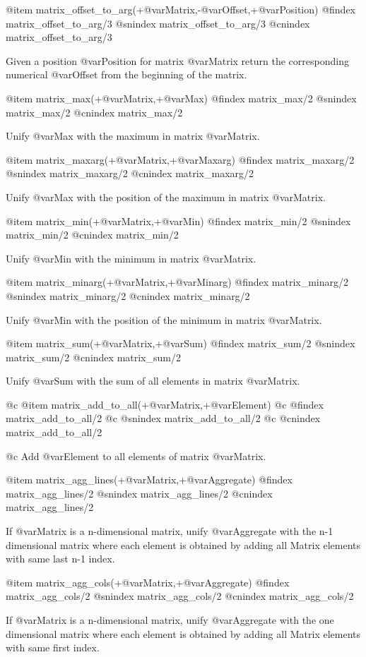 {{{{{{{{{@item matrix_offset_to_arg(+@var{Matrix},-@var{Offset},+@var{Position})
@findex matrix_offset_to_arg/3
@snindex matrix_offset_to_arg/3
@cnindex matrix_offset_to_arg/3

Given a position @var{Position } for matrix @var{Matrix} return the
corresponding numerical @var{Offset} from the beginning of the matrix.

@item matrix_max(+@var{Matrix},+@var{Max})
@findex matrix_max/2
@snindex matrix_max/2
@cnindex matrix_max/2

Unify @var{Max} with the maximum in matrix  @var{Matrix}.

@item matrix_maxarg(+@var{Matrix},+@var{Maxarg})
@findex matrix_maxarg/2
@snindex matrix_maxarg/2
@cnindex matrix_maxarg/2

Unify @var{Max} with the position of the maximum in matrix  @var{Matrix}.

@item matrix_min(+@var{Matrix},+@var{Min})
@findex matrix_min/2
@snindex matrix_min/2
@cnindex matrix_min/2

Unify @var{Min} with the minimum in matrix  @var{Matrix}.

@item matrix_minarg(+@var{Matrix},+@var{Minarg})
@findex matrix_minarg/2
@snindex matrix_minarg/2
@cnindex matrix_minarg/2

Unify @var{Min} with the position of the minimum in matrix  @var{Matrix}.

@item matrix_sum(+@var{Matrix},+@var{Sum})
@findex matrix_sum/2
@snindex matrix_sum/2
@cnindex matrix_sum/2

Unify @var{Sum} with the sum of all elements in matrix  @var{Matrix}.

@c @item matrix_add_to_all(+@var{Matrix},+@var{Element})
@c @findex matrix_add_to_all/2
@c @snindex matrix_add_to_all/2
@c @cnindex matrix_add_to_all/2

@c Add @var{Element} to all elements of matrix  @var{Matrix}.

@item matrix_agg_lines(+@var{Matrix},+@var{Aggregate})
@findex matrix_agg_lines/2
@snindex matrix_agg_lines/2
@cnindex matrix_agg_lines/2

If @var{Matrix} is a n-dimensional matrix, unify @var{Aggregate} with
the n-1 dimensional matrix where each element is obtained by adding all
Matrix elements with same last n-1 index.

@item matrix_agg_cols(+@var{Matrix},+@var{Aggregate})
@findex matrix_agg_cols/2
@snindex matrix_agg_cols/2
@cnindex matrix_agg_cols/2

If @var{Matrix} is a n-dimensional matrix, unify @var{Aggregate} with
the one dimensional matrix where each element is obtained by adding all
Matrix elements with same  first index.

}}}}}}}}}
